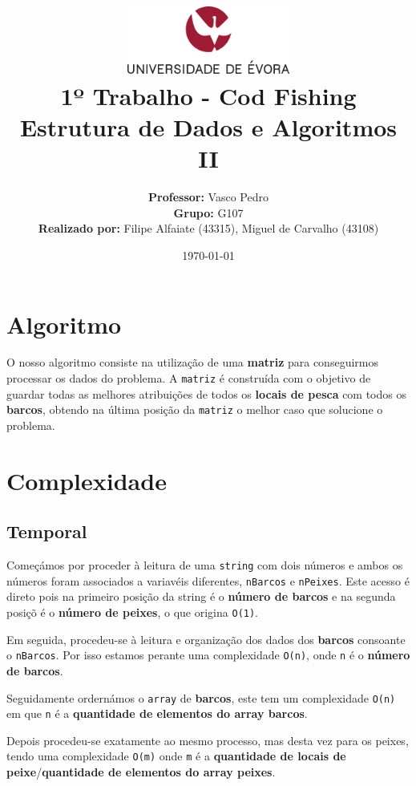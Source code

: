 \documentclass[11pt]{article}
\title
{
    \includegraphics[width=0.4\textwidth]{imgs/university.png}
    \\[0.1cm]
    \textbf{1º Trabalho - Cod Fishing} \\
    Estrutura de Dados e Algoritmos II
}
\author
{
    \textbf{Professor:} Vasco Pedro \\
    \textbf{Grupo:} G107 \\
    \textbf{Realizado por:} Filipe Alfaiate (43315), Miguel de Carvalho (43108)
}
\date{\today}
\begin{document}
\maketitle
\section{Algoritmo}

\hspace{0,5cm} O nosso algoritmo consiste na utilização de uma \textbf{matriz} para conseguirmos processar
os dados do problema. A \verb|matriz| é construída com o objetivo de guardar todas as melhores atribuições de
todos os \textbf{locais de pesca} com todos os \textbf{barcos}, obtendo na última posição da \verb|matriz|
o melhor caso que solucione o problema.


\section{Complexidade}

\subsection{Temporal}

\hspace{0,5cm}Começámos por proceder à leitura de uma \verb|string| com dois números e ambos os números foram
associados a variavéis diferentes, \verb|nBarcos| e \verb|nPeixes|. Este acesso é direto pois na
primeiro posição da string é o \textbf{número de barcos} e na segunda posiçõ é o \textbf{número de 
peixes}, o que origina \verb|O(1)|.

Em seguida, procedeu-se à leitura e organização dos dados dos \textbf{barcos} consoante o \verb|nBarcos|.
Por isso estamos perante uma complexidade \verb|O(n)|, onde \verb|n| é o \textbf{número de barcos}.

Seguidamente ordernámos o \verb|array| de \textbf{barcos}, este tem um complexidade \verb|O(n)|
em que \verb|n| é a \textbf{quantidade de elementos do array barcos}.

Depois procedeu-se exatamente ao mesmo processo, mas desta vez para os peixes, tendo uma complexidade
\verb|O(m)| onde \verb|m| é a \textbf{quantidade de locais de peixe}/\textbf{quantidade de elementos do array peixes}.
\end{document}
